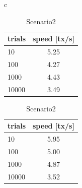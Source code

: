 \documentclass[a4paper, oneside]{discothesis}
\begin{document}
\begin{table}[t]
    \begin{center}
        \begin{tabular}{c}

            \begin{minipage}{0.5\hsize}
                \begin{center}
                    \caption{Scenario1}
                    \label{tbl:scenario1}
                    \begin{tabular}{|l|c|} \hline
                        trials & speed [tx/s]\\ \hline \hline
                        10 & 5.25 \\
                        100 & 4.27 \\
                        1000 & 4.43 \\ 
                        10000 & 3.49 \\ \hline
                    \end{tabular}
                \end{center}
            \end{minipage}

            \begin{minipage}{0.5\hsize}
                \begin{center}
                    \caption{Scenario2}
                    \label{tbl:scenario2}
                    \begin{tabular}{|l|c|} \hline
                        trials & speed [tx/s]\\ \hline \hline
                        10 &  5.95 \\
                        100 & 5.00 \\
                        1000 & 4.87 \\
                        10000 & 3.52\\ \hline
                    \end{tabular}
                \end{center}
            \end{minipage}

        \end{tabular}
    \end{center}
\end{table}
\end{document}
